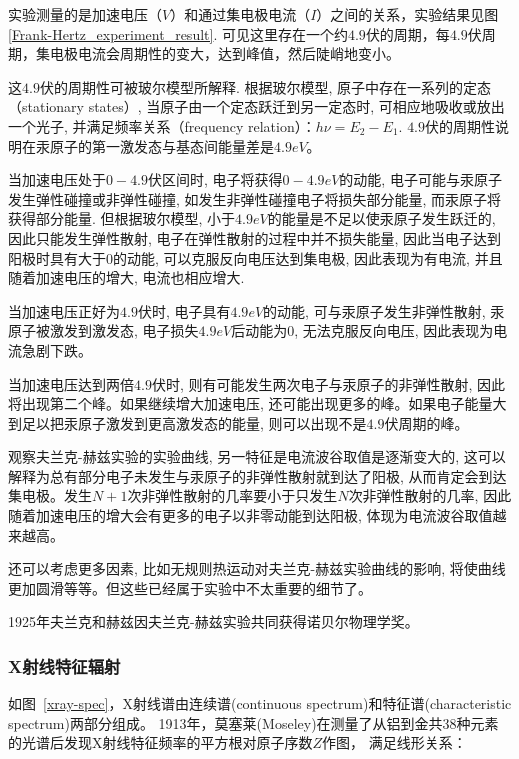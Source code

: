 实验测量的是加速电压（$V$）和通过集电极电流（$I$）之间的关系，实验结果见图\ref{Frank-Hertz_experiment_result}.
可见这里存在一个约$4.9$伏的周期，每$4.9$伏周期，集电极电流会周期性的变大，达到峰值，然后陡峭地变小。


这$4.9$伏的周期性可被玻尔模型所解释. 根据玻尔模型,
原子中存在一系列的定态（stationary states）,
当原子由一个定态跃迁到另一定态时, 可相应地吸收或放出一个光子,
并满足频率关系（frequency relation）：$h\nu =E_2 - E_1$.
$4.9$伏的周期性说明在汞原子的第一激发态与基态间能量差是$4.9eV$。

当加速电压处于$0-4.9$伏区间时, 电子将获得$0-4.9eV$的动能,
电子可能与汞原子发生弹性碰撞或非弹性碰撞,
如发生非弹性碰撞电子将损失部分能量, 而汞原子将获得部分能量.
但根据玻尔模型, 小于$4.9eV$的能量是不足以使汞原子发生跃迁的,
因此只能发生弹性散射, 电子在弹性散射的过程中并不损失能量,
因此当电子达到阳极时具有大于$0$的动能, 可以克服反向电压达到集电极,
因此表现为有电流, 并且随着加速电压的增大, 电流也相应增大.

当加速电压正好为$4.9$伏时, 电子具有$4.9eV$的动能,
可与汞原子发生非弹性散射, 汞原子被激发到激发态,
电子损失$4.9eV$后动能为0, 无法克服反向电压, 因此表现为电流急剧下跌。

当加速电压达到两倍$4.9$伏时,
则有可能发生两次电子与汞原子的非弹性散射,
因此将出现第二个峰。如果继续增大加速电压,
还可能出现更多的峰。如果电子能量大到足以把汞原子激发到更高激发态的能量,
则可以出现不是$4.9$伏周期的峰。

观察夫兰克-赫兹实验的实验曲线, 另一特征是电流波谷取值是逐渐变大的,
这可以解释为总有部分电子未发生与汞原子的非弹性散射就到达了阳极,
从而肯定会到达集电极。发生$N+1$次非弹性散射的几率要小于只发生$N$次非弹性散射的几率,
因此随着加速电压的增大会有更多的电子以非零动能到达阳极,
体现为电流波谷取值越来越高。

还可以考虑更多因素, 比如无规则热运动对夫兰克-赫兹实验曲线的影响,
将使曲线更加圆滑等等。但这些已经属于实验中不太重要的细节了。

1925年夫兰克和赫兹因夫兰克-赫兹实验共同获得诺贝尔物理学奖。


\subsubsection{X射线特征辐射}

如图~\ref{xray-spec}，X射线谱由连续谱(continuous
spectrum)和特征谱(characteristic spectrum)两部分组成。
1913年，莫塞莱(Moseley)在测量了从铝到金共38种元素的光谱后发现X射线特征频率的平方根对原子序数$Z$作图，
满足线形关系：

